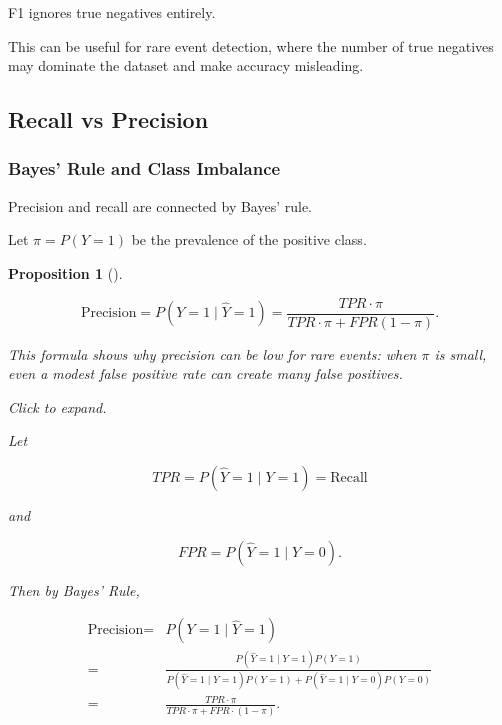 \documentclass[
  letterpaper,
  DIV=11,
  numbers=noendperiod]{scrreprt}
\theoremstyle{definition}
\theoremstyle{definition}
\theoremstyle{plain}
\theoremstyle{plain}
\newtheorem{proposition}{Proposition}[chapter]
\theoremstyle{remark}
\begin{document}
\begin{tcolorbox}[enhanced jigsaw, arc=.35mm, bottomrule=.15mm, bottomtitle=1mm, breakable, colback=white, colbacktitle=quarto-callout-note-color!10!white, colframe=quarto-callout-note-color-frame, coltitle=black, left=2mm, leftrule=.75mm, opacityback=0, opacitybacktitle=0.6, rightrule=.15mm, title=\textcolor{quarto-callout-note-color}{\faInfo}\hspace{0.5em}{Note}, titlerule=0mm, toprule=.15mm, toptitle=1mm]

F1 ignores true negatives entirely.

This can be useful for rare event detection, where the number of true
negatives may dominate the dataset and make accuracy misleading.

\end{tcolorbox}

\subsection{Recall vs Precision}\label{recall-vs-precision}

\subsubsection{Bayes' Rule and Class
Imbalance}\label{bayes-rule-and-class-imbalance}

Precision and recall are connected by Bayes' rule.

Let \(\pi=P(Y=1)\) be the prevalence of the positive class.

\begin{proposition}[]\protect\hypertarget{prp-}{}\label{prp-}

\[
\text{Precision}
=
P(Y=1\mid \hat Y=1)
=
\frac{TPR\cdot\pi}
{TPR\cdot\pi+FPR(1-\pi)}.
\]

This formula shows why precision can be low for rare events: when
\(\pi\) is small, even a modest false positive rate can create many
false positives.

Click to expand.

Let

\[
TPR=P(\hat Y=1\mid Y=1)=\text{Recall}
\]

and

\[
FPR=P(\hat Y=1\mid Y=0).
\]

Then by Bayes' Rule,

\[
\begin{split}
\text{Precision}
=&
P(Y=1\mid \hat Y=1)\\
=&\frac{P(\hat Y=1\mid Y=1)P(Y=1)}{P(\hat Y=1\mid Y=1)P(Y=1)+P(\hat Y=1\mid Y=0)P(Y=0)}\\
=&
\frac{TPR\cdot \pi}
{TPR\cdot \pi+FPR\cdot(1-\pi)}.
\end{split}
\]

\end{proposition}
\end{document}
